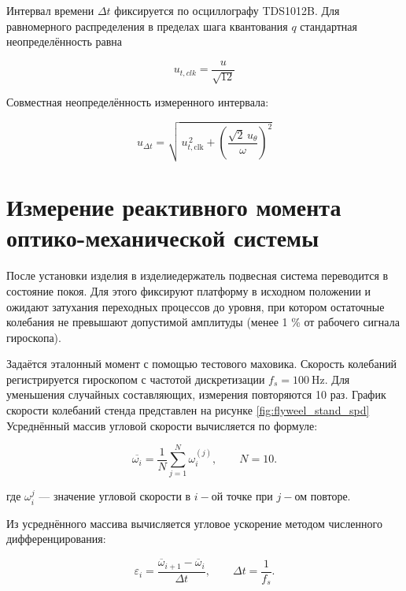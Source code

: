 Интервал времени $\Delta t$ фиксируется по осциллографу TDS1012B. Для равномерного распределения в пределах шага квантования $q$ стандартная неопределённость равна

\begin{equation}
	\label{eq:u_t,clk}
	u_{t,clk}=\frac{u}{\sqrt{12}}
\end{equation}

Совместная неопределённость измеренного интервала:

\begin{equation}
	\label{eq:u_dt}
u_{\Delta t}
= \sqrt{\,u_{t,\mathrm{clk}}^{\,2}
	+ \left(\frac{\sqrt{2}\,u_{\theta}}{\omega}\right)^{2}}
	\end{equation}
	
	
\section{Измерение реактивного момента оптико-механической системы}

После установки изделия в изделиедержатель подвесная система переводится в состояние покоя. Для этого фиксируют платформу в исходном положении и ожидают затухания переходных процессов до уровня, при котором остаточные колебания не превышают допустимой амплитуды (менее 1 \% от рабочего сигнала гироскопа).

Задаётся эталонный момент с помощью тестового маховика. Скорость колебаний регистрируется гироскопом с частотой дискретизации $f_s=\SI{100}{\hertz}$. Для уменьшения случайных составляющих, измерения повторяются 10 раз.
График скорости колебаний стенда представлен на рисунке \cref{fig:flyweel_stand_spd}
Усреднённый массив угловой скорости вычисляется по формуле:

\begin{equation}
	\label{eq:mean_spd}
	\overline{\omega_{i}}=\frac{1}{N}\sum_{j=1}^{N}\omega_{i}^{(j)}, \qquad N = 10.
\end{equation}

где \(\omega_{i}^j\) --- значение угловой скорости в $i-$ой точке при $j-$ом повторе.

Из усреднённого массива вычисляется угловое ускорение методом численного дифференцирования:

\begin{equation}
	\label{eq:mean_acc}
	\varepsilon_{i}
	= \frac{\overline{\omega}_{i+1}-\overline{\omega}_{i}}{\Delta t},
	\qquad
	\Delta t = \frac{1}{f_s}.
\end{equation}

